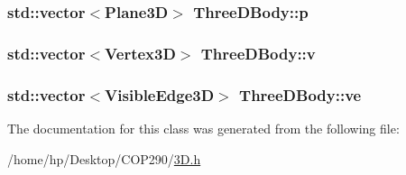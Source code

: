 \subsubsection[{\texorpdfstring{p}{p}}]{\setlength{\rightskip}{0pt plus 5cm}std\+::vector$<${\bf Plane3D}$>$ Three\+D\+Body\+::p}\hypertarget{class_three_d_body_a871bc38d1590dfb2f076a8ca2def89ad}{}\label{class_three_d_body_a871bc38d1590dfb2f076a8ca2def89ad}
\subsubsection[{\texorpdfstring{v}{v}}]{\setlength{\rightskip}{0pt plus 5cm}std\+::vector$<${\bf Vertex3D}$>$ Three\+D\+Body\+::v}\hypertarget{class_three_d_body_ae85a9587eced34b16806c2c2f009d208}{}\label{class_three_d_body_ae85a9587eced34b16806c2c2f009d208}
\subsubsection[{\texorpdfstring{ve}{ve}}]{\setlength{\rightskip}{0pt plus 5cm}std\+::vector$<${\bf Visible\+Edge3D}$>$ Three\+D\+Body\+::ve}\hypertarget{class_three_d_body_ab35d0ee77c7176e3133a9d3357d173e2}{}\label{class_three_d_body_ab35d0ee77c7176e3133a9d3357d173e2}


The documentation for this class was generated from the following file\+:\begin{DoxyCompactItemize}
\item 
/home/hp/\+Desktop/\+C\+O\+P290/\hyperlink{3_d_8h}{3\+D.\+h}\end{DoxyCompactItemize}
